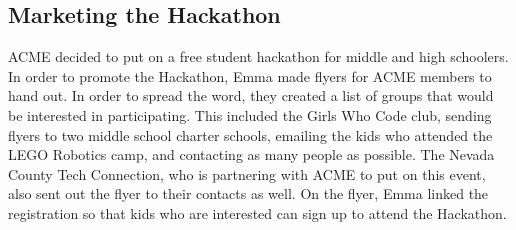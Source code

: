 \documentclass{article}
\begin{document}
\subsection{Marketing the Hackathon}
ACME decided to put on a free student hackathon for middle and high schoolers. In order to promote the Hackathon, Emma made flyers for ACME members to hand out. In order to spread the word, they created a list of groups that would be interested in participating. This included the Girls Who Code club, sending flyers to two middle school charter schools, emailing the kids who attended the LEGO Robotics camp, and contacting as many people as possible. The Nevada County Tech Connection, who is partnering with ACME to put on this event, also sent out the flyer to their contacts as well. On the flyer, Emma linked the registration so that kids who are interested can sign up to attend the Hackathon. 
\end{document}
